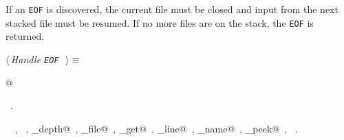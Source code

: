 \documentclass{report}
\begin{document}
If an \verb|EOF| is discovered, the current file must be closed and
input from the next stacked file must be resumed. If no more files are
on the stack, the \verb|EOF| is returned.
\begin{flushleft} \small
\begin{minipage}{\linewidth} \label{scrap144}
$\langle\,${\it Handle \verb|EOF|}\nobreak\ {\footnotesize {}}$\,\rangle\equiv$
\vspace{-1ex}
\begin{list}{}{} \item
\mbox{}@{\NWsep}
\end{list}
\vspace{-1ex}
\footnotesize\addtolength{\baselineskip}{-1ex}
\begin{list}{}{\setlength{\itemsep}{-\parsep}\setlength{\itemindent}{-\leftmargin}}
\item \NWtxtMacroRefIn\ .
\end{list}
\vspace{-2ex}
\footnotesize\addtolength{\baselineskip}{-1ex}
\begin{list}{}{\setlength{\itemsep}{-\parsep}\setlength{\itemindent}{-\leftmargin}}
\item \NWtxtIdentsUsed\nobreak\  \verb@fclose@\nobreak\ , \verb@getc@\nobreak\ , \verb@include_depth@\nobreak\ , \verb@source_file@\nobreak\ , \verb@source_get@\nobreak\ , \verb@source_line@\nobreak\ , \verb@source_name@\nobreak\ , \verb@source_peek@\nobreak\ , \verb@stack@\nobreak\ .\end{list}
\end{minipage}\\[4ex]
\end{flushleft}
\end{document}
